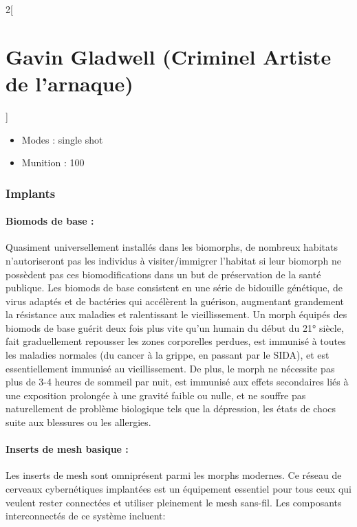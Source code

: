 \documentclass[a4paper,9pt]{article}
\begin{document}
\begin{multicols}{2}[\section*{Gavin Gladwell (Criminel Artiste de l'arnaque)}]
   \begin{itemize}
      \item Modes : single shot
      \item Munition : 100
   \end{itemize}

   \subsubsection*{Implants}

   \paragraph{Biomods de base :} 
   Quasiment universellement  installés dans les biomorphs, de nombreux habitats
   n'autoriseront pas les individus à visiter/immigrer l'habitat si leur biomorph
   ne possèdent pas ces biomodifications dans un but de préservation de la santé
   publique. Les biomods de base consistent en une série de bidouille génétique,
   de virus adaptés et de bactéries qui accélèrent la guérison, augmentant
   grandement la résistance aux maladies et ralentissant le vieillissement. Un
   morph équipés des biomods de base guérit deux fois plus vite qu'un humain du
   début du 21° siècle, fait graduellement repousser les zones corporelles
   perdues, est immunisé à toutes les maladies normales (du cancer à la grippe, en
   passant par le SIDA), et est essentiellement immunisé au vieillissement. De
   plus, le morph ne nécessite pas plus de 3-4 heures de sommeil par nuit, est
   immunisé aux effets secondaires liés à une exposition prolongée à une gravité
   faible ou nulle, et ne souffre pas naturellement de problème biologique tels
   que la dépression, les états de chocs suite aux blessures ou les allergies.

   \paragraph{Inserts de mesh basique :} 
   Les inserts de mesh sont omniprésent parmi les morphs modernes. Ce réseau de
   cerveaux cybernétiques implantées est un équipement essentiel pour tous ceux
   qui veulent rester connectées et utiliser pleinement le mesh sans-fil. Les
   composants interconnectés de ce système incluent: 


\end{multicols}
\end{document}

